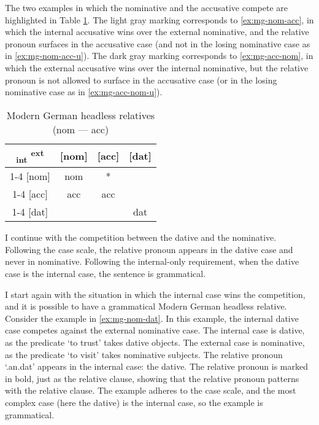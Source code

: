The two examples in which the nominative and the accusative compete are highlighted in Table \ref{tbl:case-competition-mg-nom-acc}.
The light gray marking corresponds to \ref{ex:mg-nom-acc}, in which the internal accusative wins over the external nominative, and the relative pronoun surfaces in the accusative case (and not in the losing nominative case as in \ref{ex:mg-nom-acc-u}).
The dark gray marking corresponds to \ref{ex:mg-acc-nom}, in which the external accusative wins over the internal nominative, but the relative pronoun is not allowed to surface in the accusative case (or in the losing nominative case as in \ref{ex:mg-acc-nom-u}).

 \begin{table}[ht]
   \center
   \caption{Modern German headless relatives (\ac{nom} --- \ac{acc})}
   \begin{tabular}{c|c|c|c}
     \toprule
     \textsubscript{\ac{int}} \textsuperscript{\ac{ext}}
            & [\ac{nom}]
            & [\ac{acc}]
            & [\ac{dat}]
            \\ \cmidrule{1-4}
        [\ac{nom}]
            & \ac{nom}
            & \cellcolor{DG}*
            &
            \\ \cmidrule{1-4}
        [\ac{acc}]
            & \cellcolor{LG}\ac{acc}
            & \ac{acc}
            &
            \\ \cmidrule{1-4}
        [\ac{dat}]
            &
            &
            & \ac{dat}
            \\
      \bottomrule
   \end{tabular}
     \label{tbl:case-competition-mg-nom-acc}
 \end{table}

I continue with the competition between the dative and the nominative. Following the case scale, the relative pronoun appears in the dative case and never in nominative. Following the internal-only requirement, when the dative case is the internal case, the sentence is grammatical.

I start again with the situation in which the internal case wins the competition, and it is possible to have a grammatical Modern German headless relative.
Consider the example in \ref{ex:mg-nom-dat}. In this example, the internal dative case competes against the external nominative case.
The internal case is dative, as the predicate  `to trust' takes dative objects.
The external case is nominative, as the predicate  `to visit' takes nominative subjects.
The relative pronoun  `.\ac{an}.\ac{dat}' appears in the internal case: the dative. The relative pronoun is marked in bold, just as the relative clause, showing that the relative pronoun patterns with the relative clause.
The example adheres to the case scale, and the most complex case (here the dative) is the internal case, so the example is grammatical.

